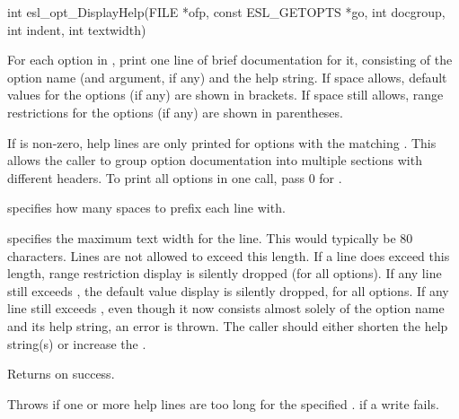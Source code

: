 \begin{sreapi}
\hypertarget{func:esl_opt_DisplayHelp()}
{\item[int esl\_opt\_DisplayHelp(FILE *ofp, const ESL\_GETOPTS *go, int docgroup, int indent,
		    int textwidth)]}

For each option in , print one line of brief
documentation for it, consisting of the option name
(and argument, if any) and the help string. If space
allows, default values for the options (if any) are
shown in brackets. If space still allows, range restrictions 
for the options (if any) are shown in parentheses.

If  is non-zero, help lines are only printed
for options with the matching .
This allows the caller to group option documentation
into multiple sections with different headers. To
print all options in one call, pass 0 for .

 specifies how many spaces to prefix each line with.

 specifies the maximum text width for the
line.  This would typically be 80 characters. Lines are
not allowed to exceed this length. If a line does exceed
this length, range restriction display is silently
dropped (for all options). If any line still exceeds
, the default value display is silently dropped,
for all options. If any line still exceeds , even 
though it now consists almost solely of the option name and 
its help string, an  error is thrown. The
caller should either shorten the help string(s) or 
increase the .

Returns  on success.

Throws  if one or more help lines are too long for
the specified .
 if a write fails.


\end{sreapi}

